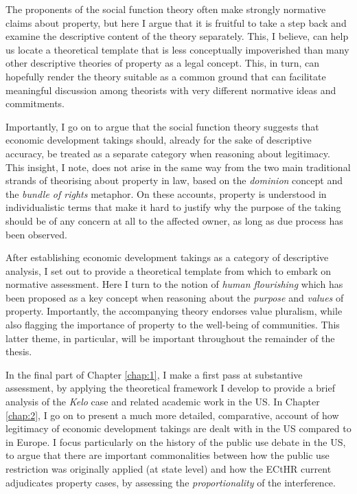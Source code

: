 \documentclass{article} %
\begin{document}
The proponents of the social function theory often make strongly normative claims about property, but here I argue that it is fruitful to take a step back and examine the descriptive content of the theory separately. This, I believe, can help us locate a theoretical template that is less conceptually impoverished than many other descriptive theories of property as a legal concept. This, in turn, can hopefully render the theory suitable as a common ground that can facilitate meaningful discussion among theorists with very different normative ideas and commitments.

Importantly, I go on to argue that the social function theory suggests that economic development takings should, already for the sake of descriptive accuracy, be treated as a separate category when reasoning about legitimacy. This insight, I note, does not arise in the same way from the two main traditional strands of theorising about property in law, based on the {\it dominion} concept and the {\it bundle of rights} metaphor. On these accounts, property is understood in individualistic terms that make it hard to justify why the purpose of the taking should be of any concern at all to the affected owner, as long as due process has been observed.

After establishing economic development takings as a category of descriptive analysis, I set out to provide a theoretical template from which to embark on normative assessment. Here I turn to the notion of {\it human flourishing} which has been proposed as a key concept when reasoning about the {\it purpose} and {\it values} of property. Importantly, the accompanying theory endorses value pluralism, while also flagging the importance of property to the well-being of communities. This latter theme, in particular, will be important throughout the remainder of the thesis. 

In the final part of Chapter \ref{chap:1}, I make a first pass at substantive assessment, by applying the theoretical framework I develop to provide a brief analysis of the {\it Kelo} case and related academic work in the US. In Chapter \ref{chap:2}, I go on to present a much more detailed, comparative, account of how legitimacy of economic development takings are dealt with in the US compared to in Europe. I focus particularly on the history of the public use debate in the US, to argue that there are important commonalities between how the public use restriction was originally applied (at state level) and how the ECtHR current adjudicates property cases, by assessing the {\it proportionality} of the interference.
\end{document}
